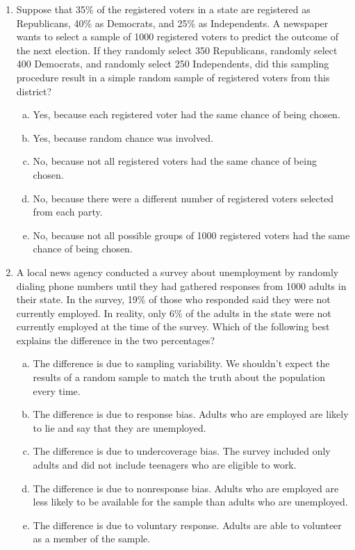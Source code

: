 \documentclass[a4paper,12pt,twoside]{book}
\begin{document}
\begin{enumerate}
    \item Suppose that 35\% of the registered voters in a state are registered as Republicans, 40\% as Democrats, and 25\% as Independents. A newspaper wants to select a sample of 1000 registered voters to predict the outcome of the next election. If they randomly select 350 Republicans, randomly select 400 Democrats, and randomly select 250 Independents, did this sampling procedure result in a simple random sample of registered voters from this district?
        \begin{enumerate}[(a)]
            \item Yes, because each registered voter had the same chance of being chosen.
            \item Yes, because random chance was involved.
            \item No, because not all registered voters had the same chance of being chosen.
            \item No, because there were a different number of registered voters selected from each party.
            \item No, because not all possible groups of 1000 registered voters had the same chance of being chosen.
        \end{enumerate}
        
    \item A local news agency conducted a survey about unemployment by randomly dialing phone numbers until they had gathered responses from 1000 adults in their state. In the survey, 19\% of those who responded said they were not currently employed. In reality, only 6\% of the adults in the state were not currently employed at the time of the survey. Which of the following best explains the difference in the two percentages?
        \begin{enumerate}[(a)]
            \item The difference is due to sampling variability. We shouldn’t expect the results of a random sample to match the truth about the population every time. 
            \item The difference is due to response bias. Adults who are employed are likely to lie and say that they are  unemployed.  
            \item The difference is due to undercoverage bias. The survey included only adults and did not include teenagers who are eligible to work.
            \item The difference is due to nonresponse bias. Adults who are employed are less likely to be available for the sample than adults who are unemployed.
            \item The difference is due to voluntary response. Adults are able to volunteer as a member of the sample.
        \end{enumerate}
    

\end{enumerate}
\end{document}
